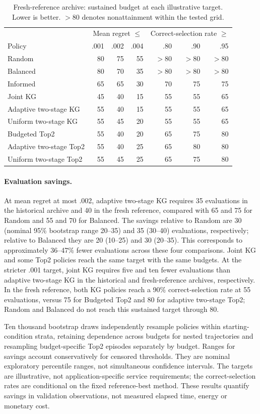 \begin{table}[htbp]
\centering\small
\caption{Fresh-reference archive: sustained budget at each illustrative target. Lower is better. $>80$ denotes nonattainment within the tested grid.}
\begin{tabular}{lrrrrrr}
\toprule
& \multicolumn{3}{c}{Mean regret $\le$} & \multicolumn{3}{c}{Correct-selection rate $\ge$}\\
Policy & .001 & .002 & .004 & .80 & .90 & .95\\
\midrule
Random & 80 & 75 & 55 & $>80$ & $>80$ & $>80$\\
Balanced & 80 & 70 & 35 & $>80$ & $>80$ & $>80$\\
Informed & 65 & 65 & 30 & 70 & 75 & 75\\
Joint KG & 45 & 40 & 15 & 55 & 55 & 65\\
Adaptive two-stage KG & 55 & 40 & 15 & 55 & 55 & 65\\
Uniform two-stage KG & 55 & 45 & 20 & 55 & 55 & 65\\
Budgeted Top2 & 55 & 40 & 20 & 65 & 75 & 80\\
Adaptive two-stage Top2 & 55 & 40 & 25 & 65 & 80 & 80\\
Uniform two-stage Top2 & 55 & 45 & 25 & 65 & 75 & 80\\
\bottomrule
\end{tabular}
\end{table}
\paragraph{Evaluation savings.}
At mean regret at most .002, adaptive two-stage KG requires 35 evaluations in the historical archive and 40 in the fresh reference, compared with 65 and 75 for Random and 55 and 70 for Balanced. The savings relative to Random are 30 (nominal 95\% bootstrap range 20--35) and 35 (30--40) evaluations, respectively; relative to Balanced they are 20 (10--25) and 30 (20--35). This corresponds to approximately 36--47\% fewer evaluations across these four comparisons. Joint KG and some Top2 policies reach the same target with the same budgets. At the stricter .001 target, joint KG requires five and ten fewer evaluations than adaptive two-stage KG in the historical and fresh-reference archives, respectively. In the fresh reference, both KG policies reach a 90\% correct-selection rate at 55 evaluations, versus 75 for Budgeted Top2 and 80 for adaptive two-stage Top2; Random and Balanced do not reach this sustained target through 80.

Ten thousand bootstrap draws independently resample policies within starting-condition strata, retaining dependence across budgets for nested trajectories and resampling budget-specific Top2 episodes separately by budget. Ranges for savings account conservatively for censored thresholds. They are nominal exploratory percentile ranges, not simultaneous confidence intervals. The targets are illustrative, not application-specific service requirements; the correct-selection rates are conditional on the fixed reference-best method. These results quantify savings in validation observations, not measured elapsed time, energy or monetary cost.
